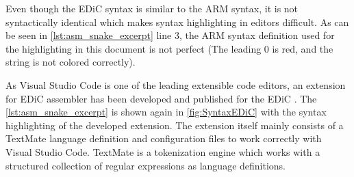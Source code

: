 Even though the \gls{EDiC} syntax is similar to the ARM syntax, it is not syntactically identical which makes syntax highlighting in editors difficult.
As can be seen in \cref{lst:asm_snake_excerpt} line 3, the ARM syntax definition used for the highlighting in this document is not perfect (The leading 0 is red, and the string is not colored correctly).

As Visual Studio Code \cite{VSCode} is one of the leading extensible code editors, an extension for \gls{EDiC} assembler has been developed and published for the \gls{EDiC} \cite{VSCodeEDiC}.
The \cref{lst:asm_snake_excerpt} is shown again in \cref{fig:SyntaxEDiC} with the syntax highlighting of the developed extension.
The extension itself mainly consists of a TextMate language definition \cite{TextMate} and configuration files to work correctly with Visual Studio Code.
TextMate is a tokenization engine which works with a structured collection of regular expressions as language definitions.